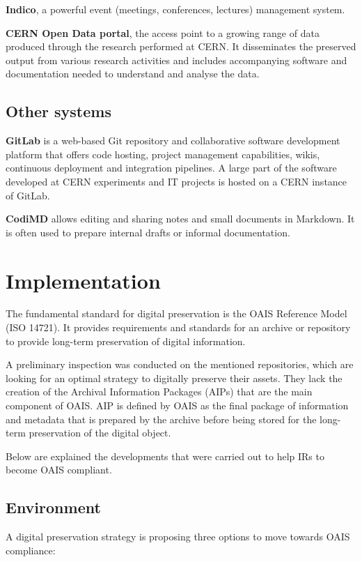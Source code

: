 \documentclass[11pt]{IEEEtran}
\begin{document}
\textbf{Indico}, a powerful event (meetings, conferences, lectures) management system.

\textbf{CERN Open Data portal}, the access point to a growing range of data produced through the research performed at CERN. It disseminates the preserved output from various research activities and includes accompanying software and documentation needed to understand and analyse the data.

\subsection{Other systems}


\textbf{GitLab} is a web-based Git repository and collaborative software development platform that offers code hosting, project management capabilities, wikis, continuous deployment and integration pipelines. A large part of the software developed at CERN experiments and IT projects is hosted on a CERN instance of GitLab.

\textbf{CodiMD} allows editing and sharing notes and small documents in Markdown. It is often used to prepare internal drafts or informal documentation.


\section{Implementation}

The fundamental standard for digital preservation is the OAIS Reference Model\cite{OAIS2002} (ISO 14721). It provides requirements and standards for an archive or repository to provide long-term preservation of digital information.

A preliminary inspection was conducted on the mentioned repositories, which are looking for an optimal strategy to digitally preserve their assets. They lack the creation of the Archival Information Packages (AIPs) that are the main component of OAIS. AIP is defined by OAIS as the final package of information and metadata that is prepared by the archive before being stored for the long-term preservation of the digital object.

Below are explained the developments that were carried out to help IRs to become OAIS compliant.

\subsection{Environment}

 A digital preservation strategy\cite{strategy} is proposing three options to move towards OAIS compliance:
 
\end{document}
